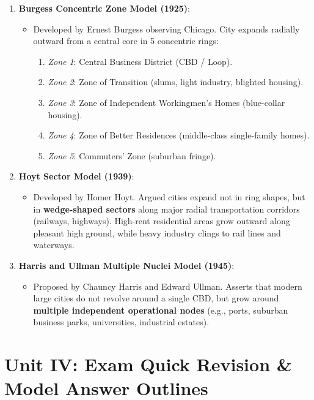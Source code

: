 \documentclass[11pt,a4paper]{article}
\begin{document}
\begin{enumerate}[leftmargin=*]
  \item \textbf{Burgess Concentric Zone Model (1925)}:
  \begin{itemize}
    \item Developed by Ernest Burgess observing Chicago. City expands radially outward from a central core in 5 concentric rings:
    \begin{enumerate}
      \item \textit{Zone 1}: Central Business District (CBD / Loop).
      \item \textit{Zone 2}: Zone of Transition (slums, light industry, blighted housing).
      \item \textit{Zone 3}: Zone of Independent Workingmen's Homes (blue-collar housing).
      \item \textit{Zone 4}: Zone of Better Residences (middle-class single-family homes).
      \item \textit{Zone 5}: Commuters' Zone (suburban fringe).
    \end{enumerate}
  \end{itemize}

  \item \textbf{Hoyt Sector Model (1939)}:
  \begin{itemize}
    \item Developed by Homer Hoyt. Argued cities expand not in ring shapes, but in \textbf{wedge-shaped sectors} along major radial transportation corridors (railways, highways). High-rent residential areas grow outward along pleasant high ground, while heavy industry clings to rail lines and waterways.
  \end{itemize}

  \item \textbf{Harris and Ullman Multiple Nuclei Model (1945)}:
  \begin{itemize}
    \item Proposed by Chauncy Harris and Edward Ullman. Asserts that modern large cities do not revolve around a single CBD, but grow around \textbf{multiple independent operational nodes} (e.g., ports, suburban business parks, universities, industrial estates).
  \end{itemize}
\end{enumerate}

\newpage
\section{Unit IV: Exam Quick Revision & Model Answer Outlines}
\end{document}
